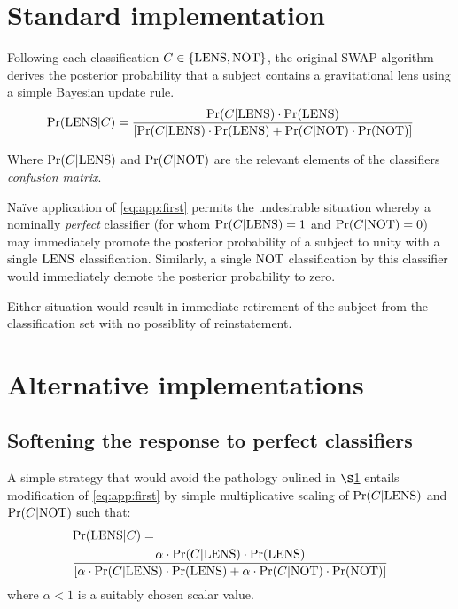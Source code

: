 \documentclass[]{article}
\begin{document}
\section{Standard implementation}\label{sec:standard_imp}
Following each classification $C\in\{{\rm LENS},{\rm NOT}\}$, the original SWAP algorithm derives the posterior probability that a subject contains a gravitational lens using a simple Bayesian update rule.
\begin{equation}
  \label{eq:app:first}
  {\rm Pr}({\rm LENS}|C) =
  \frac{{\rm Pr}(C|{\rm LENS})\cdot{\rm Pr}({\rm LENS})}
{\left[ {\rm Pr}(C|{\rm LENS})\cdot{\rm Pr}({\rm LENS}) + {\rm Pr}(C|{\rm NOT})\cdot{\rm Pr}({\rm NOT}) \right]}
\end{equation}

Where ${\rm Pr}(C|{\rm LENS})$ and ${\rm Pr}(C|{\rm NOT})$ are the relevant elements of the classifiers \textit{confusion matrix}.

Na\"ive application of \eqref{eq:app:first} permits the undesirable situation whereby a nominally \textit{perfect} classifier (for whom ${\rm Pr}(C|{\rm LENS})=1$ and ${\rm Pr}(C|{\rm NOT})=0$) may immediately promote the posterior probability of a subject to unity with a single ${\rm LENS}$ classification. Similarly, a single ${\rm NOT}$ classification by this classifier would immediately demote the posterior probability to zero.

Either situation would result in immediate retirement of the subject from the classification set with no possiblity of reinstatement.

\section{Alternative implementations}\label{sec:alternative_imps}
\subsection{Softening the response to perfect classifiers}
A simple strategy that would avoid the pathology oulined in $\S$\ref{sec:standard_imp} entails modification of \eqref{eq:app:first} by simple multiplicative scaling of ${\rm Pr}(C|{\rm LENS})$ and ${\rm Pr}(C|{\rm NOT})$ such that:
\begin{align}
  \label{eq:app:second}
  &{\rm Pr}({\rm LENS}|C) = \\ \notag
  &\frac{\alpha\cdot{\rm Pr}(C|{\rm LENS})\cdot{\rm Pr}({\rm LENS})}
{\left[ \alpha\cdot{\rm Pr}(C|{\rm LENS})\cdot{\rm Pr}({\rm LENS}) + \alpha\cdot{\rm Pr}(C|{\rm NOT})\cdot{\rm Pr}({\rm NOT}) \right]}
\end{align}
where $\alpha < 1$ is a suitably chosen scalar value.
\end{document}
